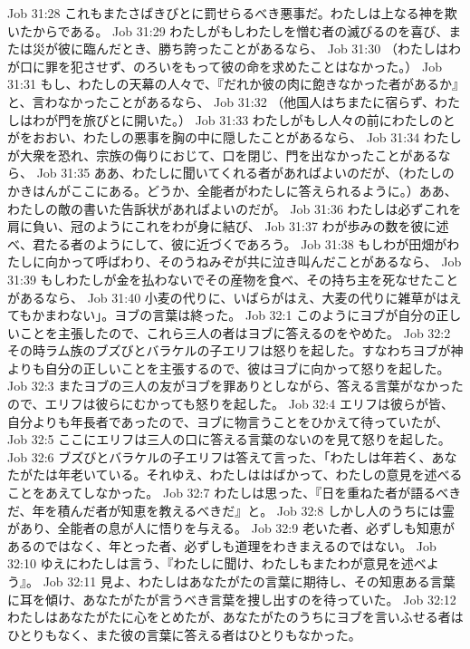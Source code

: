 Job 31:28  これもまたさばきびとに罰せらるべき悪事だ。わたしは上なる神を欺いたからである。
Job 31:29  わたしがもしわたしを憎む者の滅びるのを喜び、または災が彼に臨んだとき、勝ち誇ったことがあるなら、
Job 31:30  （わたしはわが口に罪を犯させず、のろいをもって彼の命を求めたことはなかった。）
Job 31:31  もし、わたしの天幕の人々で、『だれか彼の肉に飽きなかった者があるか』と、言わなかったことがあるなら、
Job 31:32  （他国人はちまたに宿らず、わたしはわが門を旅びとに開いた。）
Job 31:33  わたしがもし人々の前にわたしのとがをおおい、わたしの悪事を胸の中に隠したことがあるなら、
Job 31:34  わたしが大衆を恐れ、宗族の侮りにおじて、口を閉じ、門を出なかったことがあるなら、
Job 31:35  ああ、わたしに聞いてくれる者があればよいのだが、（わたしのかきはんがここにある。どうか、全能者がわたしに答えられるように。）ああ、わたしの敵の書いた告訴状があればよいのだが。
Job 31:36  わたしは必ずこれを肩に負い、冠のようにこれをわが身に結び、
Job 31:37  わが歩みの数を彼に述べ、君たる者のようにして、彼に近づくであろう。
Job 31:38  もしわが田畑がわたしに向かって呼ばわり、そのうねみぞが共に泣き叫んだことがあるなら、
Job 31:39  もしわたしが金を払わないでその産物を食べ、その持ち主を死なせたことがあるなら、
Job 31:40  小麦の代りに、いばらがはえ、大麦の代りに雑草がはえてもかまわない」。ヨブの言葉は終った。
Job 32:1  このようにヨブが自分の正しいことを主張したので、これら三人の者はヨブに答えるのをやめた。
Job 32:2  その時ラム族のブズびとバラケルの子エリフは怒りを起した。すなわちヨブが神よりも自分の正しいことを主張するので、彼はヨブに向かって怒りを起した。
Job 32:3  またヨブの三人の友がヨブを罪ありとしながら、答える言葉がなかったので、エリフは彼らにむかっても怒りを起した。
Job 32:4  エリフは彼らが皆、自分よりも年長者であったので、ヨブに物言うことをひかえて待っていたが、
Job 32:5  ここにエリフは三人の口に答える言葉のないのを見て怒りを起した。
Job 32:6  ブズびとバラケルの子エリフは答えて言った、「わたしは年若く、あなたがたは年老いている。それゆえ、わたしははばかって、わたしの意見を述べることをあえてしなかった。
Job 32:7  わたしは思った、『日を重ねた者が語るべきだ、年を積んだ者が知恵を教えるべきだ』と。
Job 32:8  しかし人のうちには霊があり、全能者の息が人に悟りを与える。
Job 32:9  老いた者、必ずしも知恵があるのではなく、年とった者、必ずしも道理をわきまえるのではない。
Job 32:10  ゆえにわたしは言う、『わたしに聞け、わたしもまたわが意見を述べよう』。
Job 32:11  見よ、わたしはあなたがたの言葉に期待し、その知恵ある言葉に耳を傾け、あなたがたが言うべき言葉を捜し出すのを待っていた。
Job 32:12  わたしはあなたがたに心をとめたが、あなたがたのうちにヨブを言いふせる者はひとりもなく、また彼の言葉に答える者はひとりもなかった。
